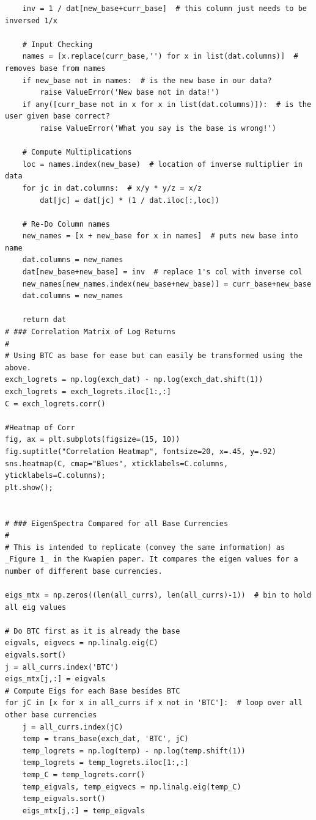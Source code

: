 \documentclass[a4paper]{article}
\begin{document}
\begin{lstlisting}
    inv = 1 / dat[new_base+curr_base]  # this column just needs to be inversed 1/x
    
    # Input Checking
    names = [x.replace(curr_base,'') for x in list(dat.columns)]  # removes base from names
    if new_base not in names:  # is the new base in our data?
        raise ValueError('New base not in data!')
    if any([curr_base not in x for x in list(dat.columns)]):  # is the user given base correct?
        raise ValueError('What you say is the base is wrong!')
    
    # Compute Multiplications
    loc = names.index(new_base)  # location of inverse multiplier in data
    for jc in dat.columns:  # x/y * y/z = x/z
        dat[jc] = dat[jc] * (1 / dat.iloc[:,loc])
    
    # Re-Do Column names
    new_names = [x + new_base for x in names]  # puts new base into name
    dat.columns = new_names
    dat[new_base+new_base] = inv  # replace 1's col with inverse col
    new_names[new_names.index(new_base+new_base)] = curr_base+new_base
    dat.columns = new_names
    
    return dat
# ### Correlation Matrix of Log Returns
# 
# Using BTC as base for ease but can easily be transformed using the above.
exch_logrets = np.log(exch_dat) - np.log(exch_dat.shift(1))
exch_logrets = exch_logrets.iloc[1:,:]
C = exch_logrets.corr() 

#Heatmap of Corr
fig, ax = plt.subplots(figsize=(15, 10))
fig.suptitle("Correlation Heatmap", fontsize=20, x=.45, y=.92)
sns.heatmap(C, cmap="Blues", xticklabels=C.columns, yticklabels=C.columns);
plt.show();


# ### EigenSpectra Compared for all Base Currencies
# 
# This is intended to replicate (convey the same information) as _Figure 1_ in the Kwapien paper. It compares the eigen values for a number of different base currencies. 

eigs_mtx = np.zeros((len(all_currs), len(all_currs)-1))  # bin to hold all eig values

# Do BTC first as it is already the base
eigvals, eigvecs = np.linalg.eig(C)
eigvals.sort()
j = all_currs.index('BTC')
eigs_mtx[j,:] = eigvals
# Compute Eigs for each Base besides BTC
for jC in [x for x in all_currs if x not in 'BTC']:  # loop over all other base currencies
    j = all_currs.index(jC)
    temp = trans_base(exch_dat, 'BTC', jC)
    temp_logrets = np.log(temp) - np.log(temp.shift(1))
    temp_logrets = temp_logrets.iloc[1:,:]
    temp_C = temp_logrets.corr() 
    temp_eigvals, temp_eigvecs = np.linalg.eig(temp_C)
    temp_eigvals.sort()
    eigs_mtx[j,:] = temp_eigvals


\end{lstlisting}
\end{document}
